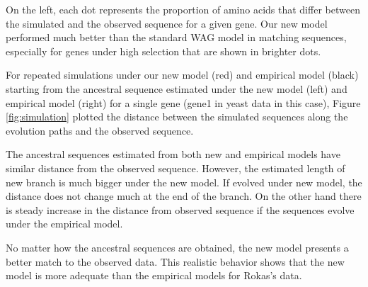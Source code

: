 {\color{blue} On the left, each dot represents the proportion of amino acids that differ between the simulated and the observed sequence for a given gene. 
Our new model performed much better than the standard WAG model in matching sequences, especially for genes under high selection that are shown in brighter dots. }

For repeated simulations under our new model (red) and empirical model (black) starting from the ancestral sequence estimated under the new model (left) and empirical model (right) for a single gene (gene1 in yeast data in this case), Figure \ref{fig:simulation} plotted the distance between the simulated sequences along the evolution paths and the observed sequence. 

The ancestral sequences estimated from both new and empirical models have similar distance from the observed sequence. However, the estimated length of new branch is much bigger under the new model.
If evolved under new model, the distance does not change much at the end of the branch.
On the other hand there is steady increase in the distance from observed sequence if the sequences evolve under the empirical model. 

No matter how the ancestral sequences are obtained, the new model presents a better match to the observed data.
This realistic behavior shows that the new model is more adequate than the empirical models for Rokas's data.

